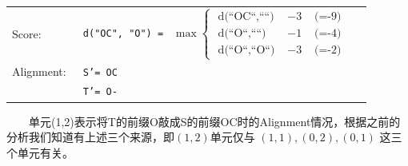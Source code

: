  \begin{tiny}
  \begin{table}
  \begin{tabular}{lll}

  Score:  & \texttt{ d("OC", "O") = } $  \max \left \{  \begin{array}{lll} \text{ d(``OC``,````) } & -3  & \text{ (=-9) } \\
  													\text{ d(``O``,````) }      & -1  & \text{ (=-4) } \\
													\text{ d(``O``,``O``) }   &  -3 & \text{ (=-2) } \end{array} \right.  $       \\
    Alignment:  &  \texttt{  S'=  OC } \\
   		     &	\texttt{ T'=  O- } \\
  \end{tabular}
  \end{table}
  \end{tiny}

\begin{flushleft}
~~~~单元(1,2)表示将T的前缀O敲成S的前缀OC时的Alignment情况，根据之前的分析我们知道有上述三个来源，即$(1,2)$单元仅与 $(1,1),(0,2),(0,1)$ 这三个单元有关。
\end{flushleft}


